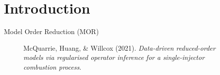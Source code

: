\setcounter{framenumber}{0}

\section{Introduction}
\label{sec:intro}

\begin{frame}{Model Order Reduction (MOR)}
  \begin{figure}
    \centering
    \caption*{\tiny McQuarrie, Huang, \& Willcox (2021). \textit{Data-driven reduced-order models via regularised operator inference for a single-injector combustion process}.}
  \end{figure}

\end{frame}


